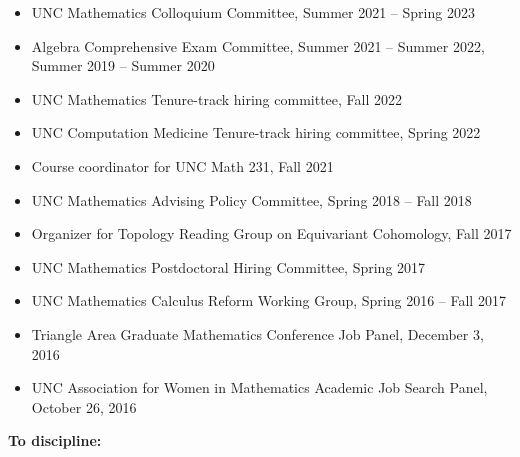 \documentclass[10pt]{article}
\begin{document}
\begin{itemize}
\item UNC Mathematics Colloquium Committee, Summer 2021 -- Spring 2023

\item Algebra Comprehensive Exam Committee, 
Summer 2021 -- Summer 2022, \\
Summer 2019 -- Summer 2020

\item UNC Mathematics Tenure-track hiring committee, Fall 2022

\item UNC Computation Medicine Tenure-track hiring committee, Spring 2022

\item Course coordinator for UNC Math 231, Fall 2021

\item UNC Mathematics Advising Policy Committee, Spring 2018 -- Fall 2018

\item Organizer for Topology Reading Group on Equivariant Cohomology, Fall 2017

\item UNC Mathematics Postdoctoral Hiring Committee, Spring 2017

\item UNC Mathematics Calculus Reform Working Group, Spring 2016 -- Fall 2017

\item Triangle Area Graduate Mathematics Conference Job Panel, December 3, 2016

\item UNC Association for Women in Mathematics Academic Job Search Panel, October 26, 2016

\end{itemize}


\noindent\textbf{To discipline:}
\end{document}
